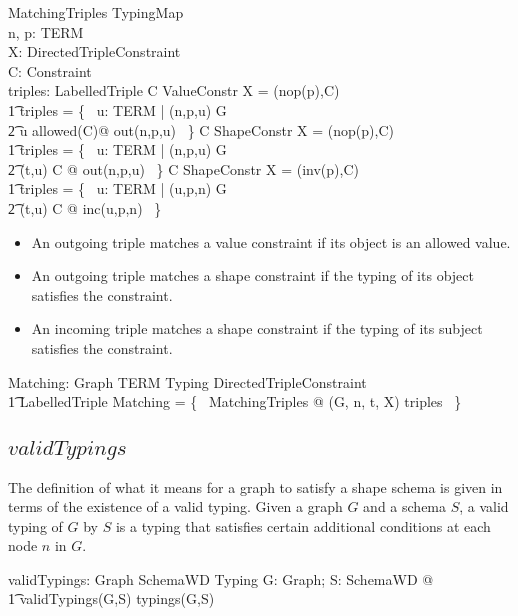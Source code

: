 \documentclass{article}
\begin{document}
\begin{schema}{MatchingTriples}
	TypingMap \\
	n, p: TERM \\
	X: DirectedTripleConstraint \\
	C: Constraint \\
	triples: \finset LabelledTriple
\where
	C \in ValueConstr \land X = (nop(p),C) \implies \\
\t1		triples = \{~ u: TERM | (n,p,u) \in G \land \\
\t2			u \in allowed(C)@ out(n,p,u) ~\}
\also
	C \in ShapeConstr \land X = (nop(p),C) \implies \\
\t1		triples = \{~ u: TERM | (n,p,u) \in G \land \\
\t2			(t,u)  C @ out(n,p,u) ~\}
\also
	C \in ShapeConstr \land X = (inv(p),C) \implies \\
\t1		triples = \{~ u: TERM | (u,p,n) \in G \land \\
\t2			(t,u)  C @ inc(u,p,n) ~\}
\end{schema}
\begin{itemize}
\item An outgoing triple matches a value constraint if its object is an allowed value.
\item An outgoing triple matches a shape constraint if the typing of its object satisfies the constraint.
\item An incoming triple matches a shape constraint if the typing of its subject satisfies the constraint.
\end{itemize}

\begin{axdef}
	Matching: Graph \cross TERM \cross Typing \cross DirectedTripleConstraint \fun \\
\t1		\finset LabelledTriple
\where
	Matching = \{~ MatchingTriples @ (G, n, t, X) \mapsto triples ~\}
\end{axdef}

\subsection{$validTypings$}
The definition of what it means for a graph to satisfy a shape schema is given in terms of the existence of a valid typing.
Given a graph $G$ and a schema $S$, a valid typing of $G$ by $S$ is a typing that satisfies certain additional conditions
at each node $n$ in $G$.
\begin{axdef}
	validTypings: Graph \cross SchemaWD \fun \power Typing
\where
	\forall G: Graph; S: SchemaWD @ \\
\t1		validTypings(G,S) \subseteq typings(G,S)
\end{axdef}
\end{document}
